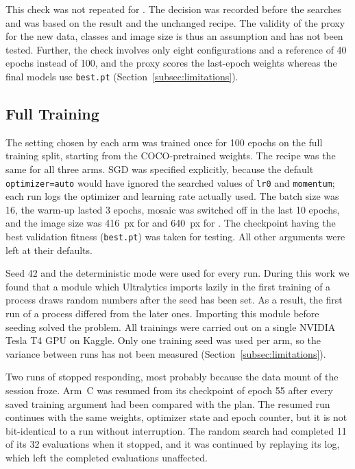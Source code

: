 This check was not repeated for \gentwo. The decision was recorded before the \gentwo searches and was based on the \genone result and the unchanged recipe. The validity of the proxy for the new data, classes and image size is thus an assumption and has not been tested. Further, the check involves only eight configurations and a reference of 40 epochs instead of 100, and the proxy scores the last-epoch weights whereas the final models use \texttt{best.pt} (Section~\ref{subsec:limitations}).

\subsection{Full Training}
\label{subsec:training}

The setting chosen by each arm was trained once for 100 epochs on the full training split, starting from the COCO-pretrained weights. The recipe was the same for all three arms. SGD was specified explicitly, because the default \texttt{optimizer=auto} would have ignored the searched values of \texttt{lr0} and \texttt{momentum}; each run logs the optimizer and learning rate actually used. The batch size was 16, the warm-up lasted 3 epochs, mosaic was switched off in the last 10 epochs, and the image size was 416~px for \genone and 640~px for \gentwo. The checkpoint having the best validation fitness (\texttt{best.pt}) was taken for testing. All other arguments were left at their defaults.

Seed 42 and the deterministic mode were used for every run. During this work we found that a module which Ultralytics imports lazily in the first training of a process draws random numbers after the seed has been set. As a result, the first run of a process differed from the later ones. Importing this module before seeding solved the problem. All trainings were carried out on a single NVIDIA Tesla T4 GPU on Kaggle. Only one training seed was used per arm, so the variance between runs has not been measured (Section~\ref{subsec:limitations}).

Two runs of \gentwo stopped responding, most probably because the data mount of the session froze. Arm~C was resumed from its checkpoint of epoch 55 after every saved training argument had been compared with the plan. The resumed run continues with the same weights, optimizer state and epoch counter, but it is not bit-identical to a run without interruption. The random search had completed 11 of its 32 evaluations when it stopped, and it was continued by replaying its log, which left the completed evaluations unaffected.

